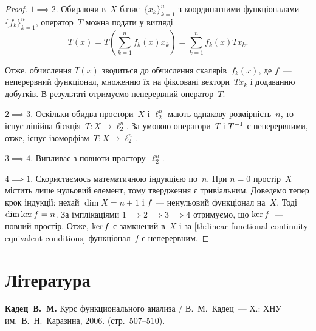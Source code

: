 \begin{proof}
    $1 \implies 2$. Обираючи в~$X$ базис~$\{x_k\}_{k = 1}^n$ з координатними функціоналами~$\{f_k\}_{k = 1}^n$, оператор~$T$ можна подати у вигляді
    \begin{equation*}
        T(x) = T \left( \sum_{k = 1}^n f_k(x) x_k \right) = \sum_{k = 1}^n f_k(x) T x_k. 
    \end{equation*}
    
    Отже, обчислення $T(x)$ зводиться до обчислення скалярів~$f_k(x)$, де $f$~--- неперервний функціонал, множенню їх на фіксовані вектори~$Tx_k$ і додаванню добутків. В результаті отримуємо неперервний оператор~$T$.
    
    $2 \implies 3$. Оскільки обидва простори~$X$ і $\ell_2^n$ мають однакову розмірність~$n$, то існує лінійна бієкція~$T: X \to \ell_2^n$. За умовою оператори~$T$ і $T^{-1}$ є неперервними, отже, існує ізоморфізм~$T: X \to \ell_2^n$.
    
    $3 \implies 4$. Випливає з повноти простору~$\ell_2^n$.

    $4 \implies 1$. Скористаємось математичною індукцією по~$n$. При $n = 0$ простір~$X$ містить лише нульовий елемент, тому твердження є тривіальним. Доведемо тепер крок індукції: нехай $\dim X = n + 1$ і $f$~--- ненульовий функціонал на~$X$. Тоді $\dim \operatorname{ker} f = n$. За імплікаціями $1 \implies 2 \implies 3 \implies 4$ отримуємо, що $\operatorname{ker} f$~--- повний простір. Отже, $\operatorname{ker} f$ є замкнений в~$X$ і за \cref{th:linear-functional-continuity-equivalent-conditions} функціонал~$f$ є неперервним.
\end{proof}

\section{Література}

\begin{enumerate}[label={[\arabic*]}]
\item \textbf{Кадец~В.~М.}
Курс функционального анализа /
В.~М.~Кадец~---
Х.: ХНУ им.~В.~Н.~Каразина, 2006. (стр.~507--510).
\end{enumerate}
